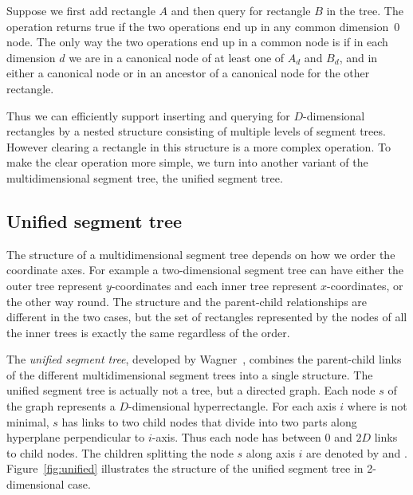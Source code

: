 \documentclass[english,gradu]{tktltiki2018}
\begin{document}
Suppose we first add rectangle $A$ and then query for rectangle $B$ in the tree.
The \checkdt operation returns true if the two operations end up in any common dimension~0 node.
The only way the two operations end up in a common node is if in each dimension $d$ we are in a canonical node of at least one of $A_d$ and $B_d$, and in either a canonical node or in an ancestor of a canonical node for the other rectangle.

Thus we can efficiently support inserting and querying for $D$-dimensional rectangles by a nested structure consisting of multiple levels of segment trees.
However clearing a rectangle in this structure is a more complex operation.
To make the clear operation more simple, we turn into another variant of the multidimensional segment tree, the unified segment tree.

\subsection{Unified segment tree}\label{sec:unifiedtree}

The structure of a multidimensional segment tree depends on how we order the coordinate axes.
For example a two-dimensional segment tree can have either the outer tree represent $y$-coordinates and each inner tree represent $x$-coordinates, or the other way round.
The structure and the parent-child relationships are different in the two cases, but the set of rectangles represented by the nodes of all the inner trees is exactly the same regardless of the order.

The \emph{unified segment tree}, developed by Wagner~\cite{unified}, combines the parent-child links of the different multidimensional segment trees into a single structure.
The unified segment tree is actually not a tree, but a directed graph.
Each node $s$ of the graph represents a $D$-dimensional hyperrectangle.
For each axis $i$ where  is not minimal, $s$ has links to two child nodes that divide  into two parts along hyperplane perpendicular to $i$-axis.
Thus each node has between 0 and $2D$ links to child nodes.
The children splitting the node $s$ along axis $i$ are denoted by  and .
Figure~\ref{fig:unified} illustrates the structure of the unified segment tree in 2-dimensional case.
\end{document}
